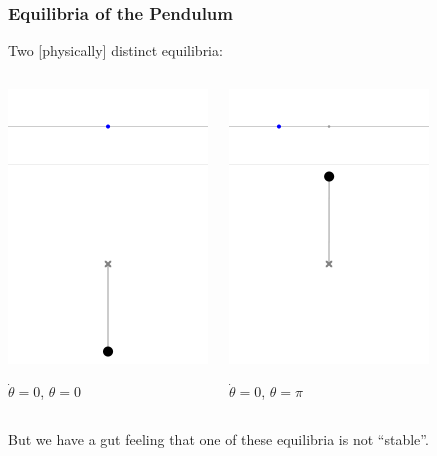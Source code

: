 \documentclass[12pt]{beamer}
\begin{document}
\begin{frame}
\frametitle{Equilibria of the Pendulum}

Two [physically] distinct equilibria:

\begin{columns}


\begin{center}
\includegraphics[width=.4\linewidth]{pic/Pendulum_0deg.png}

$\dot\theta = 0$, $\theta=0$

\end{center}



\begin{center}
\includegraphics[width=.4\linewidth]{pic/Pendulum_180deg.png}

$\dot\theta = 0$, $\theta=\pi$
\end{center}


\end{columns}

\vfill
But we have a gut feeling that one of these equilibria is not ``stable''.

\end{frame}
\end{document}
